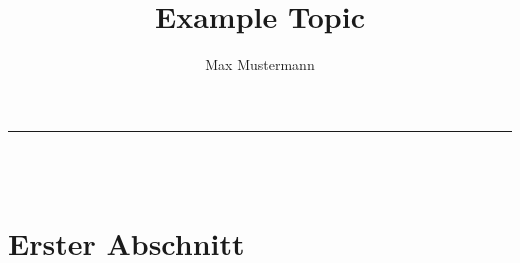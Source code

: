 \documentclass[english,ngerman,ttfont=roboto]{tudscrmanual}
\title{Example Topic}
\author{Max Mustermann}
\makeatletter
\newcommand{\linia}{\rule{\linewidth}{0.5pt}}
\renewcommand{\maketitle}{\begin{center}
\huge \@title\end{center}
\linia\\
{\large\@author\hfill\@date\\}}
\makeatother
\begin{document}
\maketitle

\section{Erster Abschnitt}
\end{document}
